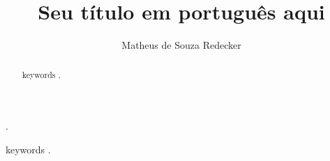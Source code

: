 \documentclass[portuguese,oneside]{tcc}
\author{Matheus de Souza Redecker}
\title{Seu título em português aqui}
      {Your title in english here}
\begin{document}



\begin{agradecimentos}
.
\end{agradecimentos}

\begin{resumo}{keywords}
.
\end{resumo}

\begin{abstract}{keywords}
.
\end{abstract}

\tableofcontents     %
\end{document}
